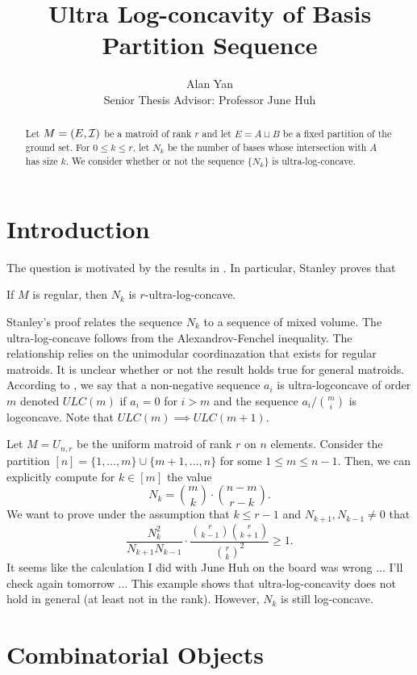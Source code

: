 \documentclass[12pt]{article}
\title{Ultra Log-concavity of Basis Partition Sequence}
\author{Alan Yan \\ Senior Thesis Advisor: Professor June Huh}
\begin{document}
\maketitle

\begin{abstract}
	Let $M = (E, \mathcal{I})$ be a matroid of rank $r$ and let $E = A \sqcup B$ be a fixed partition of the ground set. For $0 \leq k \leq r$, let $N_k$ be the number of bases whose intersection with $A$ has size $k$. We consider whether or not the sequence $\{N_k\}$ is ultra-log-concave. 
\end{abstract}
\tableofcontents

\newpage 

\section{Introduction}

The question is motivated by the results in \cite{STANLEY}. In particular, Stanley proves that 
\begin{thm}
	If $M$ is regular, then $N_k$ is $r$-ultra-log-concave. 
\end{thm}

Stanley's proof relates the sequence $N_k$ to a sequence of mixed volume. The ultra-log-concave follows from the Alexandrov-Fenchel inequality. The relationship relies on the unimodular coordinazation that exists for regular matroids. It is unclear whether or not the result holds true for general matroids. According to \cite{LIGGETT}, we say that a non-negative sequence $a_i$ is ultra-logconcave of order $m$ denoted $ULC(m)$ if $a_i = 0$ for $i > m$ and the sequence $a_i / \binom{m}{i}$ is logconcave. Note that $ULC(m) \implies ULC(m+1)$. 

\begin{example}
	Let $M = U_{n, r}$ be the uniform matroid of rank $r$ on $n$ elements. Consider the partition $[n] = \{1, \ldots, m \} \cup \{m+1, \ldots, n \}$ for some $1 \leq m \leq n-1$. Then, we can explicitly compute for $k \in [m]$ the value 
	\[
		N_k = \binom{m}{k} \cdot \binom{n-m}{r-k}.
	\]
	We want to prove under the assumption that $k \leq r-1$ and $N_{k+1}, N_{k-1} \neq 0$ that 
	\[
		\frac{N_k^2}{N_{k+1} N_{k-1}} \cdot \frac{\binom{r}{k-1} \binom{r}{k+1}}{\binom{r}{k}^2} \geq 1. 
	\]
	It seems like the calculation I did with June Huh on the board was wrong ... I'll check again tomorrow ... This example shows that ultra-log-concavity does not hold in general (at least not in the rank). However, $N_k$ is still log-concave. 
\end{example}

\section{Combinatorial Objects}




\end{document}
